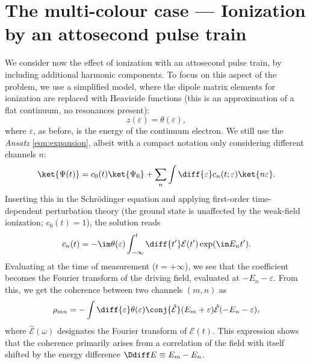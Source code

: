 \section{The multi-colour case --- Ionization by an attosecond pulse
  train}
\label{sec:multi-colour}
We consider now the effect of ionization with an attosecond pulse
train, by including additional harmonic components. To focus on this
aspect of the problem, we use a simplified model, where the dipole
matrix elements for ionization are replaced with Heaviside functions
(this is an approximation of a flat continuum, \ie no resonances
present):
\begin{equation}
  z(\varepsilon) = \theta(\varepsilon),
\end{equation}
where \(\varepsilon\), as before, is the energy of the continuum electron. We
still use the \emph{Ansatz} \eqref{eqn:expansion}, albeit with a
compact notation only considering different channels \(n\):
\begin{equation}
  \label{eqn:expansion-simplified}
  \ket{\Psi(t)}
  =
  c_0(t)\ket{\Psi_0}
  +\sum_n \int \diff{\varepsilon}
  c_n(t;\varepsilon)\ket{n\varepsilon}.
\end{equation}
Inserting this in the Schrödinger equation and applying first-order
time-dependent perturbation theory (\ie the ground state is unaffected
by the weak-field ionization; \(c_0(t)=1\)), the solution reads
\begin{equation}
  \label{eqn:spectral-model-solution}
  c_n(t)
  =-\im\theta(\varepsilon)
  \int_{-\infty}^t\diff{t'}
  \mathcal{E}(t')
  \exp(\im E_n t').
\end{equation}
Evaluating at the time of measurement (\(t=+\infty\)), we see that the
coefficient becomes the Fourier transform of the driving field,
evaluated at \(-E_n - \varepsilon\). From this, we get the coherence between two
channels \((m,n)\) as
\begin{equation}
  \label{eqn:simplified-coherence}
  \rho_{mn}
  =-\int\diff{\varepsilon}\theta(\varepsilon)
  \conj{\hat{\mathcal{E}}}(E_m+\varepsilon)
  \hat{\mathcal{E}}(-E_n-\varepsilon),
\end{equation}
where \(\hat{\mathcal{E}}(\omega)\) designates the Fourier transform of
\(\mathcal{E}(t)\). This expression shows that the coherence primarily
arises from a correlation of the field with itself shifted by the
energy difference \(\Ddiff E \equiv E_m-E_n\).

